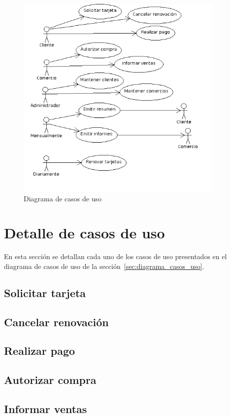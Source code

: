 \begin{figure}[htb]
\begin{center}
\includegraphics[width=0.9\textwidth]{images/mod_casosuso_diagrama.png}
\end{center}
\caption{Diagrama de casos de uso}
\label{fig:modcasosuso:diagramacasos}
\end{figure}

\FloatBarrier

\section{Detalle de casos de uso}

En esta sección se detallan cada uno de los casos de uso presentados en el
diagrama de casos de uso de la sección~\ref{sec:diagrama_casos_uso}.

\subsection{Solicitar tarjeta}


\subsection{Cancelar renovación}


\subsection{Realizar pago}


\subsection{Autorizar compra}


\subsection{Informar ventas}

